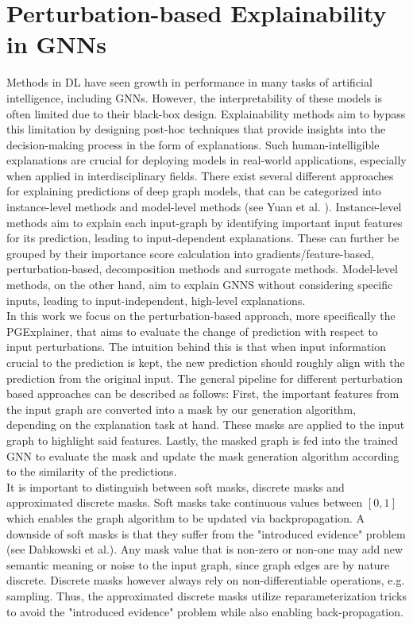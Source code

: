 \section{Perturbation-based Explainability in GNNs}
Methods in DL have seen growth in performance in many tasks of artificial intelligence, including GNNs. However, the interpretability of these models is often limited due to their black-box design. Explainability methods aim to bypass this limitation by designing post-hoc techniques that provide insights into the decision-making process in the form of explanations. Such human-intelligible explanations are crucial for deploying models in real-world applications, especially when applied in interdisciplinary fields. There exist several different approaches for explaining predictions of deep graph models, that can be categorized into instance-level methods and model-level methods (see Yuan et al. \cite{yuan2022explainability}). Instance-level methods aim to explain each input-graph by identifying important input features for its prediction, leading to input-dependent explanations. These can further be grouped by their importance score calculation into gradients/feature-based, perturbation-based, decomposition methods and surrogate methods. Model-level methods, on the other hand, aim to explain GNNS without considering specific inputs, leading to input-independent, high-level explanations. \\
In this work we focus on the perturbation-based approach, more specifically the PGExplainer\cite{luo2020parameterized}, that aims to evaluate the change of prediction with respect to input perturbations. The intuition behind this is that when input information crucial to the prediction is kept, the new prediction should roughly align with the prediction from the original input. The general pipeline for different perturbation based approaches can be described as follows: First, the important features from the input graph are converted into a mask by our generation algorithm, depending on the explanation task at hand. These masks are applied to the input graph to highlight said features. Lastly, the masked graph is fed into the trained GNN to evaluate the mask and update the mask generation algorithm according to the similarity of the predictions. \\
It is important to distinguish between soft masks, discrete masks and approximated discrete masks. Soft masks take continuous values between $[0,1]$ which enables the graph algorithm to be updated via backpropagation. A downside of soft masks is that they suffer from the "introduced evidence" problem (see Dabkowski et al.\cite{dabkowski2017real}). Any mask value that is non-zero or non-one may add new semantic meaning or noise to the input graph, since graph edges are by nature discrete. Discrete masks however always rely on non-differentiable operations, e.g. sampling. Thus, the approximated discrete masks utilize reparameterization tricks to avoid the "introduced evidence" problem while also enabling back-propagation. \\
